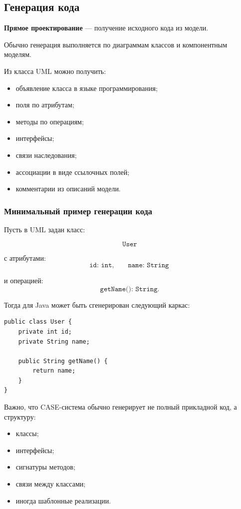 \documentclass[12pt,a4paper]{article}
\begin{document}
\subsection{Генерация кода}

\textbf{Прямое проектирование} --- получение исходного кода из модели.

Обычно генерация выполняется по диаграммам классов и компонентным моделям.

Из класса UML можно получить:
\begin{itemize}
    \item объявление класса в языке программирования;
    \item поля по атрибутам;
    \item методы по операциям;
    \item интерфейсы;
    \item связи наследования;
    \item ассоциации в виде ссылочных полей;
    \item комментарии из описаний модели.
\end{itemize}

\subsubsection{Минимальный пример генерации кода}

Пусть в UML задан класс:

\[
\texttt{User}
\]

с атрибутами:
\[
\texttt{id: int}, \qquad \texttt{name: String}
\]

и операцией:
\[
\texttt{getName(): String}.
\]

Тогда для Java может быть сгенерирован следующий каркас:

\begin{verbatim}
public class User {
    private int id;
    private String name;

    public String getName() {
        return name;
    }
}
\end{verbatim}

Важно, что CASE-система обычно генерирует не полный прикладной код, а структуру:
\begin{itemize}
    \item классы;
    \item интерфейсы;
    \item сигнатуры методов;
    \item связи между классами;
    \item иногда шаблонные реализации.
\end{itemize}
\end{document}
